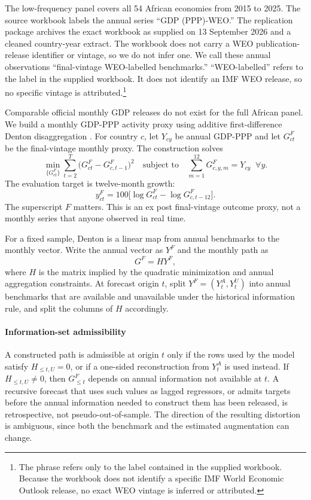 \documentclass[preprint,12pt,authoryear]{elsarticle}
\begin{document}
The low-frequency panel covers all 54 African economies from 2015 to 2025. The
source workbook labels the annual series ``GDP (PPP)-WEO.'' The replication
package archives the exact workbook as supplied on 13 September 2026 and a
cleaned country-year extract. The workbook does not carry a WEO
publication-release identifier or vintage, so we do not infer one. We call
these annual observations ``final-vintage WEO-labelled benchmarks.''
``WEO-labelled'' refers to the label in the supplied workbook. It does not
identify an IMF WEO release, so no specific vintage is attributed.\footnote{The
phrase refers only to the label contained in the supplied workbook. Because
the workbook does not identify a specific IMF World Economic Outlook release,
no exact WEO vintage is inferred or attributed.}

Comparable official monthly GDP releases do not exist for the full African
panel. We build a monthly GDP-PPP activity proxy using additive first-difference
Denton disaggregation \citep{denton1971,imfqna2017}. For country $c$, let
$Y_{cy}$ be annual GDP-PPP and let $G^F_{ct}$ be the final-vintage monthly
proxy. The construction solves
\begin{equation}
\min_{\{G^F_{ct}\}} \sum_{t=2}^{T} \bigl(G^F_{ct} - G^F_{c,t-1}\bigr)^2
\quad \text{subject to} \quad
\sum_{m=1}^{12} G^F_{c,y,m} = Y_{cy} \;\; \forall y.
\label{eq:denton}
\end{equation}
The evaluation target is twelve-month growth:
\begin{equation}
y^F_{ct} = 100\bigl[\log G^F_{ct} - \log G^F_{c,t-12}\bigr].
\label{eq:gdp12}
\end{equation}
The superscript $F$ matters. This is an ex post final-vintage outcome proxy,
not a monthly series that anyone observed in real time.

For a fixed sample, Denton is a linear map from annual benchmarks to the
monthly vector. Write the annual vector as $Y^F$ and the monthly path as
\begin{equation}
G^F = H Y^F,
\label{eq:linear_operator}
\end{equation}
where $H$ is the matrix implied by the quadratic minimization and annual
aggregation constraints. At forecast origin $t$, split $Y^F = (Y^A_t, Y^U_t)$
into annual benchmarks that are available and unavailable under the historical
information rule, and split the columns of $H$ accordingly.

\paragraph{Information-set admissibility}
A constructed path is admissible at origin $t$ only if the rows used by the
model satisfy $H_{\leq t,U} = 0$, or if a one-sided reconstruction from
$Y^A_t$ is used instead. If $H_{\leq t,U} \neq 0$, then $G^F_{\leq t}$ depends
on annual information not available at $t$. A recursive forecast that uses
such values as lagged regressors, or admits targets before the annual
information needed to construct them has been released, is retrospective, not
pseudo-out-of-sample. The direction of the resulting distortion is ambiguous,
since both the benchmark and the estimated augmentation can change.
\end{document}
